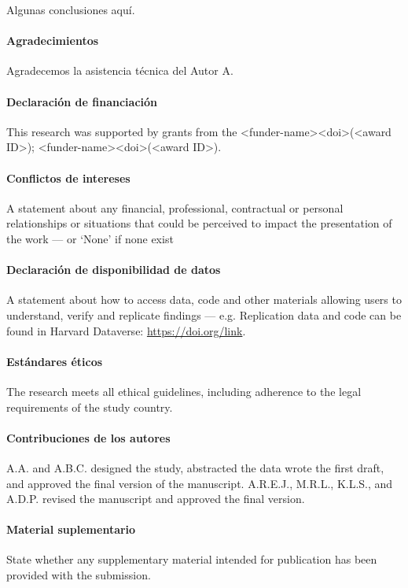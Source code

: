 \documentclass{GEM-JNL-FMP}
\theoremstyle{definition}
\numberwithin{equation}{section}
\begin{document}
Algunas conclusiones aquí.

\begin{Backmatter}

\paragraph{Agradecimientos}
Agradecemos la asistencia técnica del Autor A.

\paragraph{Declaración de financiación}
This research was supported by grants from the <funder-name><doi>(<award ID>); <funder-name><doi>(<award ID>).

\paragraph{Conflictos de intereses}
A statement about any financial, professional, contractual or personal relationships or situations that could be perceived to impact the presentation of the work --- or `None' if none exist

\paragraph{Declaración de disponibilidad de datos}
A statement about how to access data, code and other materials allowing users to understand, verify and replicate findings --- e.g. Replication data and code can be found in Harvard Dataverse: \url{https://doi.org/link}.

\paragraph{Estándares éticos}
The research meets all ethical guidelines, including adherence to the legal requirements of the study country.

\paragraph{Contribuciones de los autores}
A.A. and A.B.C. designed the study, abstracted the data wrote the first draft, and approved the final
version of the manuscript. A.R.E.J., M.R.L., K.L.S., and A.D.P. revised the manuscript and approved the final version.

\paragraph{Material suplementario}
State whether any supplementary material intended for publication has been provided with the submission.




\end{Backmatter}
\end{document}
